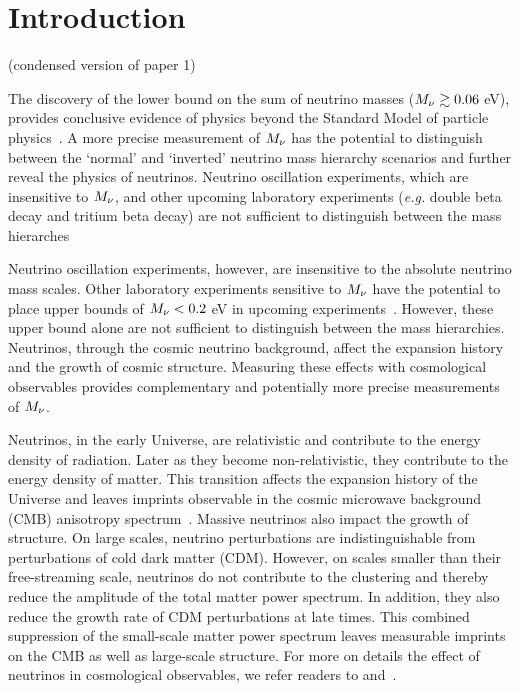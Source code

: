 \section{Introduction} \label{sec:intro}

 (condensed version of paper 1)

The discovery of the lower bound on the sum of neutrino masses ($M_\nu \gtrsim 0.06$ eV), 
provides conclusive evidence of 
physics beyond the Standard Model of particle physics~\citep{forero2014, gonzalez-garcia2016}. 
A more precise measurement of $M_\nu$ has the potential to distinguish 
between the `normal' and `inverted' neutrino mass hierarchy scenarios 
and further reveal the physics of neutrinos. 
Neutrino oscillation experiments, which are insensitive to $M_\nu$, and 
other upcoming laboratory experiments (\emph{e.g.} double beta 
decay and tritium beta decay) are not
sufficient to distinguish between the mass hierarches

Neutrino oscillation 
experiments, however, are insensitive to the absolute neutrino mass scales. 
Other laboratory experiments sensitive to $M_\nu$  have the potential to place upper 
bounds of $M_\nu < 0.2$ eV in upcoming experiments~\citep{bonn2011, drexlin2013}. 
However, these upper bound alone are not sufficient to distinguish between the mass
hierarchies. Neutrinos, through the cosmic neutrino background, affect the 
expansion history and the growth of cosmic structure. Measuring these effects 
with cosmological observables provides complementary and potentially more 
precise measurements of $M_\nu$. 

Neutrinos, in the early Universe, are relativistic and contribute to the 
energy density of radiation. Later as they become non-relativistic, 
they contribute to the energy density of matter. This transition affects 
the expansion history of the Universe and leaves imprints observable in 
the cosmic microwave background (CMB) anisotropy spectrum~\citep{lesgourgues2012, lesgourgues2014}. 
Massive neutrinos also impact the growth of structure. On large scales, 
neutrino perturbations are indistinguishable from perturbations of cold 
dark matter (CDM). However, on scales smaller than their free-streaming 
scale, neutrinos do not contribute to the clustering and thereby reduce 
the amplitude of the total matter power spectrum. In addition, they also reduce the growth 
rate of CDM perturbations at late times. This combined suppression of 
the small-scale matter power spectrum leaves measurable imprints 
on the CMB as well as large-scale structure. For more on details the effect
of neutrinos in cosmological observables, we refer readers to 
\cite{lesgourgues2012,lesgourgues2014} and~\cite{gerbino2018}. 



